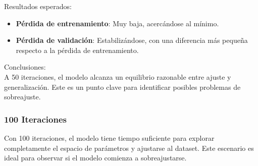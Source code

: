 \documentclass{article}
\begin{document}
{\large{Resultados esperados}}:
\begin{itemize}
    \item \textbf{Pérdida de entrenamiento}: Muy baja, acercándose al mínimo.
    \item \textbf{Pérdida de validación}: Estabilizándose, con una diferencia más pequeña respecto a la pérdida de entrenamiento.
\end{itemize}

{\large{Conclusiones}}: \\

A 50 iteraciones, el modelo alcanza un equilibrio razonable entre ajuste y generalización. Este es un punto clave para identificar posibles problemas de sobreajuste.

\newpage

\subsubsection{100 Iteraciones}
Con 100 iteraciones, el modelo tiene tiempo suficiente para explorar completamente el espacio de parámetros y ajustarse al dataset. Este escenario es ideal para observar si el modelo comienza a sobreajustarse. \\
\end{document}
